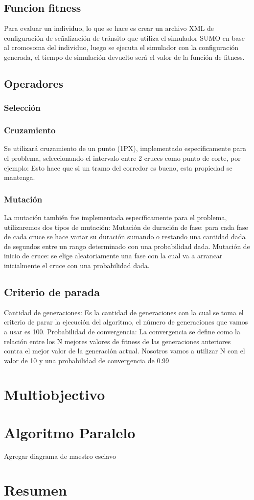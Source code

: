 \subsection{Funcion fitness}
Para evaluar un individuo, lo que se hace es crear un archivo
XML  de configuración de señalización de tránsito que utiliza
el  simulador  SUMO  en  base  al  cromosoma  del  individuo,
luego se ejecuta el simulador con la configuración generada, el
tiempo de simulación devuelto será el valor de la función de
fitness.

\subsection{Operadores}
\subsubsection{Selección}
\subsubsection{Cruzamiento}
Se  utilizará  cruzamiento  de  un  punto  (1PX),  implementado
específicamente  para  el  problema,  seleccionando  el  intervalo
entre 2 cruces como punto de corte, por ejemplo:
Esto  hace  que  si  un  tramo  del  corredor  es  bueno,  esta
propiedad se mantenga.

\subsubsection{Mutación}
La  mutación también fue  implementada  específicamente para
el problema, utilizaremos dos tipos de mutación:
Mutación de duración de fase: para cada fase de cada cruce se
hace variar su duración sumando o restando una cantidad dada
de segundos entre un rango determinado con una probabilidad
dada.
Mutación de inicio de cruce: se elige aleatoriamente una fase
con  la  cual  va  a  arrancar  inicialmente  el  cruce  con  una
probabilidad dada.

\subsection{Criterio de parada}
 Cantidad  de  generaciones:  Es  la  cantidad  de
 generaciones  con  la  cual  se  toma  el  criterio  de  parar  la
 ejecución del algoritmo, el número de generaciones que vamos
 a usar es 100.
 Probabilidad  de  convergencia:  La  convergencia  se
 define como la relación entre los N mejores valores de fitness
 de  las  generaciones  anteriores  contra  el  mejor  valor  de  la
 generación actual. Nosotros vamos a utilizar N con el valor de
 10 y una probabilidad de convergencia de 0.99




\section{Multiobjectivo}

\section{Algoritmo Paralelo}
Agregar diagrama de maestro esclavo



\section{Resumen}